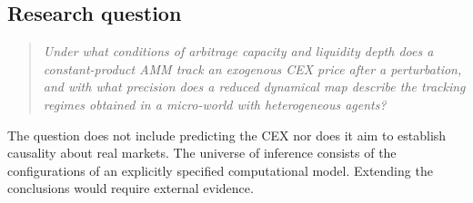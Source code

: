 \FloatBarrier
\begin{samepage}
\section{Research question}

\begin{quote}
\emph{Under what conditions of arbitrage capacity and liquidity depth does a constant-product AMM track an exogenous CEX price after a perturbation, and with what precision does a reduced dynamical map describe the tracking regimes obtained in a micro-world with heterogeneous agents?}
\end{quote}
\end{samepage}

The question does not include predicting the CEX nor does it aim to establish causality about real markets. The universe of inference consists of the configurations of an explicitly specified computational model. Extending the conclusions would require external evidence.
